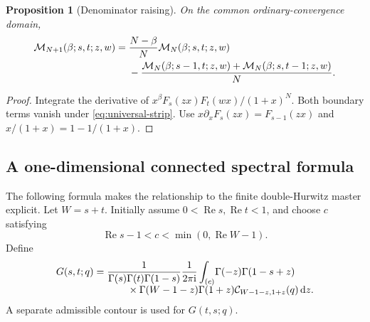 \documentclass[11pt]{article}
\numberwithin{equation}{section}
\newtheorem{proposition}[theorem]{Proposition}
\theoremstyle{definition}
\DeclareMathOperator{\Rea}{Re}
\newcommand{\dd}{\,\mathrm d}
\newcommand{\ii}{\mathrm i}
\newcommand{\CC}{\mathcal C}
\newcommand{\MM}{\mathcal M}
\begin{document}
\begin{proposition}[Denominator raising]\label{prop:raising}
On the common ordinary-convergence domain,
\begin{align}\label{eq:raising}
 \MM_{N+1}(\beta;s,t;z,w)
 ={}&\frac{N-\beta}{N}\MM_N(\beta;s,t;z,w)\\
 &-\frac{\MM_N(\beta;s-1,t;z,w)+\MM_N(\beta;s,t-1;z,w)}{N}.\notag
\end{align}
\end{proposition}
\begin{proof}
Integrate the derivative of $x^\beta F_s(zx)F_t(wx)/(1+x)^N$. Both boundary terms vanish under \eqref{eq:universal-strip}. Use $x\partial_xF_s(zx)=F_{s-1}(zx)$ and $x/(1+x)=1-1/(1+x)$.
\end{proof}

\subsection{A one-dimensional connected spectral formula}
The following formula makes the relationship to the finite double-Hurwitz master explicit. Let $W=s+t$. Initially assume $0<\Rea s,\Rea t<1$, and choose $c$ satisfying
\begin{equation}\label{eq:cone-contour}
 \Rea s-1<c<\min(0,\Rea W-1).
\end{equation}
Define
\begin{align}\label{eq:G-cone}
 G(s,t;q)=\frac1{\Gamma(s)\Gamma(t)\Gamma(1-s)}\frac1{2\pi\ii}
 \int_{(c)}&\Gamma(-z)\Gamma(1-s+z)\\[-5pt]
 &\hspace{-31mm}\times\Gamma(W-1-z)\Gamma(1+z)
 \CC_{W-1-z,1+z}(q)\dd z.\notag
\end{align}
A separate admissible contour is used for $G(t,s;q)$.
\end{document}
